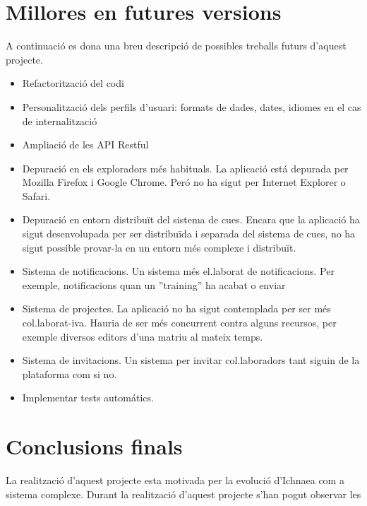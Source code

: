 \section{Millores en futures versions}
A continuació es dona una breu descripció de possibles treballs futurs d'aquest projecte.
\begin{itemize}
\item Refactoritzaci\'{o} del codi
\item Personalitzaci\'{o} dels perfils d'usuari: formats de dades, dates, idiomes en el cas de internalitzaci\'{o}
\item Ampliaci\'{o} de les API Restful
\item Depuraci\'{o} en els exploradors m\'{e}s habituals. La aplicaci\'{o} est\'{a} depurada per Mozilla Firefox i Google Chrome. Per\'{o} no ha sigut per Internet Explorer o Safari.
\item Depuraci\'{o} en entorn distribuït del sistema de cues. Encara que la aplicaci\'{o} ha sigut desenvolupada per ser distribuïda i separada del sistema de cues, no ha sigut possible provar-la en un entorn m\'{e}s complexe i distribuït.
\item Sistema de notificacions. Un sistema m\'{e}s el.laborat de notificacions. Per exemple, notificacions quan un ''training'' ha acabat o enviar
\item Sistema de projectes. La aplicaci\'{o} no ha sigut contemplada per ser m\'{e}s col.laborat-iva. Hauria de ser m\'{e}s concurrent contra alguns recursos, per exemple diversos editors d'una matriu al mateix temps.
\item Sistema de invitacions. Un sistema per invitar col.laboradors tant siguin de la plataforma com si no.
\item Implementar tests autom\'{a}tics.
\end{itemize}

\section{Conclusions finals}
La realització d'aquest projecte esta motivada per la evolució d'Ichnaea com a sistema complexe. Durant la realització d'aquest projecte s'han pogut observar les 
